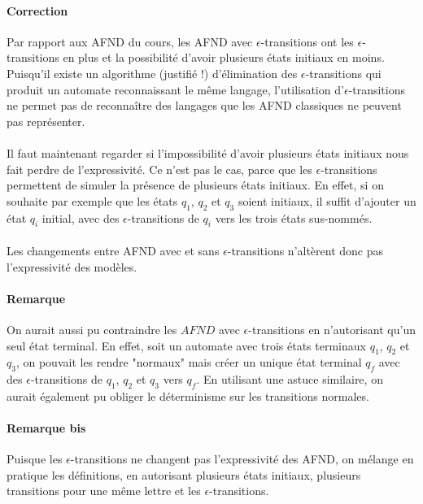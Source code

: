 \documentclass{article}[11pt]
\theoremstyle{definition}
\begin{document}
\paragraph*{Correction} Par rapport aux AFND du cours, les AFND avec $\epsilon$-transitions ont les $\epsilon$-transitions en plus et la possibilité d'avoir plusieurs états initiaux en moins. Puisqu'il existe un algorithme (justifié !) d'élimination des $\epsilon$-transitions qui produit un automate reconnaissant le même langage, l'utilisation d'$\epsilon$-transitions ne permet pas de reconnaître des langages que les AFND classiques ne peuvent pas représenter.

\paragraph*{}Il faut maintenant regarder si l'impossibilité d'avoir plusieurs états initiaux nous fait perdre de l'expressivité. Ce n'est pas le cas, parce que les $\epsilon$-transitions permettent de simuler la présence de plusieurs états initiaux. En effet, si on souhaite par exemple que les états $q_1$, $q_2$ et $q_3$ soient initiaux, il suffit d'ajouter un état $q_i$ initial, avec des $\epsilon$-transitions de $q_i$ vers les trois états sus-nommés.

\paragraph*{} Les changements entre AFND avec et sans $\epsilon$-transitions n'altèrent donc pas l'expressivité des modèles.

\paragraph*{Remarque} On aurait aussi pu contraindre les $AFND$ avec $\epsilon$-transitions en n'autorisant qu'un seul état terminal. En effet, soit un automate avec trois états terminaux $q_1$, $q_2$ et $q_3$, on pouvait les rendre "normaux" mais créer un unique état terminal $q_f$ avec des $\epsilon$-transitions de $q_1$, $q_2$ et $q_3$ vers $q_f$. En utilisant une astuce similaire, on aurait également pu obliger le déterminisme sur les transitions normales.

\paragraph*{Remarque bis} Puisque les $\epsilon$-transitions ne changent pas l'expressivité des AFND, on mélange en pratique les définitions, en autorisant plusieurs états initiaux, plusieurs transitions pour une même lettre et les $\epsilon$-transitions.  
\end{document}
